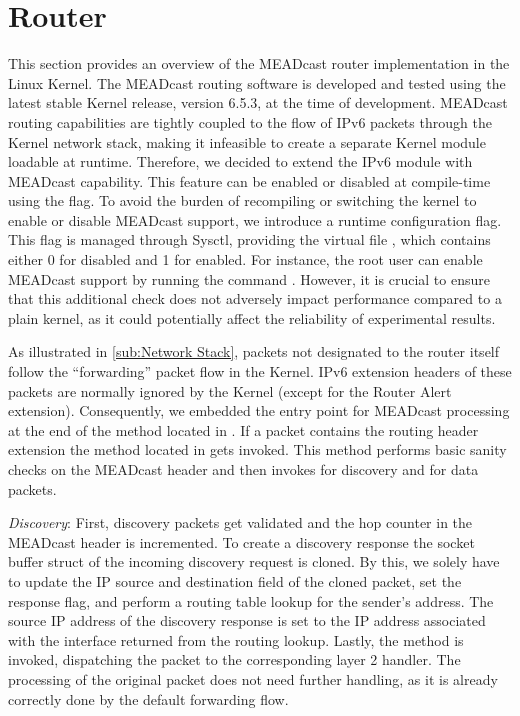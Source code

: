 \section{Router} %
\label{sec:Router}
This section provides an overview of the MEADcast router implementation in the
    Linux Kernel.
The MEADcast routing software is developed and tested using the latest stable
    Kernel release, version 6.5.3, at the time of development.
MEADcast routing capabilities are tightly coupled to the flow of IPv6 packets
    through the Kernel network stack, making it infeasible to create a separate
    Kernel module loadable at runtime.
Therefore, we decided to extend the IPv6 module with MEADcast capability.
This feature can be enabled or disabled at compile-time using the
     flag.
To avoid the burden of recompiling or switching the kernel to enable or disable
    MEADcast support, we introduce a runtime configuration flag.
This flag is managed through Sysctl, providing the virtual file
    , which contains either 0 for
    disabled and 1 for enabled.
For instance, the root user can enable MEADcast support by running the command
    .
However, it is crucial to ensure that this additional check does not adversely
    impact performance compared to a plain kernel, as it could potentially
    affect the reliability of experimental results.

As illustrated in \autoref{sub:Network Stack}, packets not designated to the
    router itself follow the ``forwarding'' packet flow in the Kernel.
IPv6 extension headers of these packets are normally ignored by the Kernel
    (except for the Router Alert extension).
Consequently, we embedded the entry point for MEADcast processing at the end of
    the  method located in
    .
If a packet contains the routing header extension the 
    method located in  gets invoked.
This method performs basic sanity checks on the MEADcast header and then
    invokes  for discovery and
     for data packets.

\textit{Discovery}: First, discovery packets get validated and the hop counter
    in the MEADcast header is incremented.
To create a discovery response the socket buffer struct of the incoming
    discovery request is cloned.
By this, we solely have to update the IP source and destination field of the
    cloned packet, set the response flag, and perform a routing table lookup
    for the sender's address.
The source IP address of the discovery response is set to the IP address
    associated with the interface returned from the routing lookup.
Lastly, the  method is invoked, dispatching the packet to
    the corresponding layer 2 handler.
The processing of the original packet does not need further handling, as it is
    already correctly done by the default forwarding flow.


